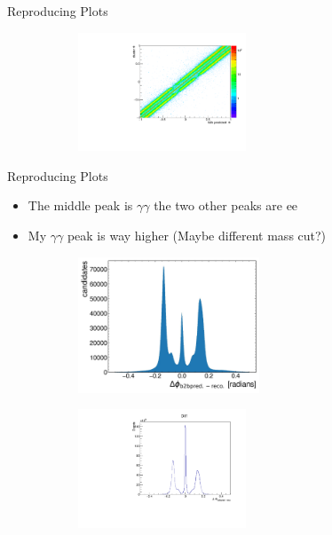 \documentclass[10pt]{beamer}
\begin{document}
{\begin{frame}{Reproducing Plots}
\begin{figure}
\begin{subfigure}{.5\textwidth}
			\label{fig:sub1}
		\end{subfigure}%
		\begin{subfigure}{.5\textwidth}
			\centering
			\includegraphics[width=5cm]{Plots/zommedb2b}
			
			\label{fig:sub2}
		\end{subfigure}
		
		\label{fig:test}
	\end{figure}
		
\end{frame}


\begin{frame}{Reproducing Plots}
\begin{itemize} 
	\item The middle peak is $\gamma \gamma$ the two other peaks are $\textrm{ee}$
	\item My $\gamma \gamma$ peak is way higher (Maybe different mass cut?)

\end{itemize}
\begin{figure}
	\centering
	\begin{subfigure}{.5\textwidth}
		\centering
		\includegraphics[width=5.4cm]{Plots/deltaPhiSam.jpeg}
	
		\label{fig:sub1}
	\end{subfigure}%
	\begin{subfigure}{.5\textwidth}
		\centering
		\includegraphics[width=5cm]{Plots/DeltaPhi.pdf}
	

\end{subfigure}
\end{figure}
\end{frame}}
\end{document}
